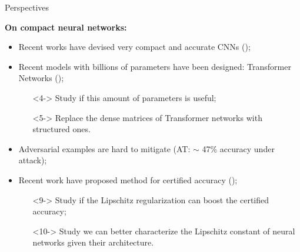\begin{frame}{Perspectives}

  {\small
    \textbf{On compact neural networks:} 
    \begin{itemize}[leftmargin=0.2cm]
      \item <2-> Recent works have devised very compact and accurate CNNs ({});
      \item <3-> Recent models with billions of parameters have been designed: Transformer Networks ({});
      \begin{itemize}
	\item[\orange{$\rightarrow$}] <4-> Study if this amount of parameters is useful;
	\item[\orange{$\rightarrow$}] <5-> Replace the dense matrices of Transformer networks with structured ones. 
      \end{itemize}
    \end{itemize}
  }

  \vspace{0.5cm}
  {\small
    \begin{itemize}[leftmargin=0.2cm]
      \item <7-> Adversarial examples are hard to mitigate (AT: $\sim$ 47\% accuracy under attack);
      \item <8-> Recent work have proposed method for certified accuracy ({});
      \begin{itemize}
	\item[\orange{$\rightarrow$}] <9-> Study if the Lipschitz regularization can boost the certified accuracy; 
	\item[\orange{$\rightarrow$}] <10-> Study we can better characterize the Lipschitz constant of neural networks given their architecture. 
      \end{itemize}
    \end{itemize}
  }



\end{frame}



